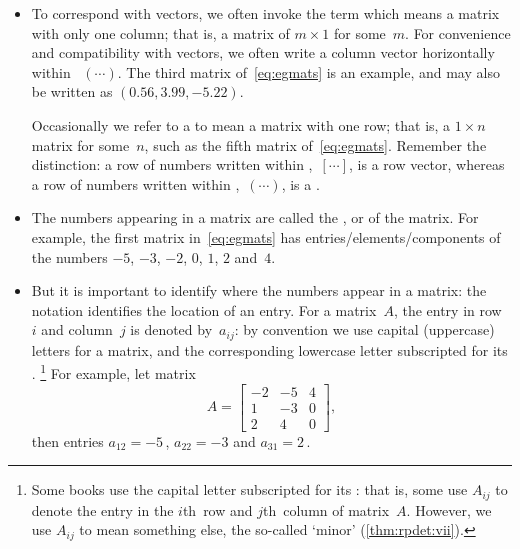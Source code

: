 \begin{itemize}
\item To correspond with vectors,  we often invoke the term  which means a matrix with only one column; that is, a matrix of  \(m\times 1\) for some~\(m\).
For convenience and compatibility with vectors, we often write a column vector horizontally within ~\((\cdots )\).
The third matrix of~\eqref{eq:egmats} is an example, and may also be written as \((0.56,3.99,-5.22)\).

Occasionally we refer to a  to mean a matrix with one row; that is, a \(1\times n\) matrix for some~\(n\), such as the fifth matrix of~\eqref{eq:egmats}.  
Remember the distinction: a row of numbers written within ,~\([\cdots]\), is a row vector, whereas a row of numbers written within ,~\((\cdots)\), is a .

\item The numbers appearing in a matrix are called the ,  or  of the matrix.  
For example, the first matrix in~\eqref{eq:egmats} has entries\slash elements\slash components of the numbers \(-5\), \(-3\), \(-2\), \(0\), \(1\), \(2\) and~\(4\).

\item But it is important to identify where the numbers appear in a matrix:  the  notation identifies the location of an entry.
For a matrix~\(A\), the entry in row~\(i\) and column~\(j\) is denoted by~\(a_{ij}\):
by convention we use capital (uppercase) letters for a matrix, and the corresponding lowercase letter subscripted for its .%
\footnote{Some books use the capital letter subscripted for its : that is, some use \(A_{ij}\) to denote the entry in the \(i\)th~row and \(j\)th~column of matrix~\(A\).  
However, we use \(A_{ij}\) to mean something else, the so-called `minor' (\cref{thm:rpdet:vii}).}
For example, let matrix
\begin{equation*}
A=\begin{bmatrix}   -2 & -5 & 4
\\ 1 & -3 & 0
\\ 2 & 4 & 0 \end{bmatrix},
\end{equation*}
then entries \(a_{12}=-5\)\,, \(a_{22}=-3\) and \(a_{31}=2\)\,.

\end{itemize}
